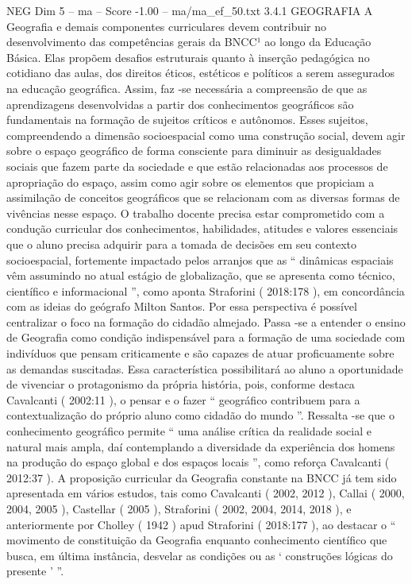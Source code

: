 \begin{textsample}{NEG Dim 5 – ma – Score -1.00 – ma/ma\_ef\_50.txt}  \label{ex:f5_neg_117}
3.4.1 GEOGRAFIA A Geografia e demais componentes curriculares devem contribuir no desenvolvimento das competências gerais da BNCC¹ ao longo da Educação Básica.
Elas propõem desafios estruturais quanto à inserção pedagógica no cotidiano das aulas, dos direitos éticos, estéticos e políticos a serem assegurados na educação geográfica.
Assim, faz -se necessária a compreensão de que as aprendizagens desenvolvidas a partir dos conhecimentos geográficos são fundamentais na formação de sujeitos críticos e autônomos.
Esses sujeitos, compreendendo a dimensão socioespacial como uma construção social, devem agir sobre o espaço geográfico de forma consciente para diminuir as desigualdades sociais que fazem parte da sociedade e que estão relacionadas aos processos de apropriação do espaço, assim como agir sobre os elementos que propiciam a assimilação de conceitos geográficos que se relacionam com as diversas formas de vivências nesse espaço.
O trabalho docente precisa estar comprometido com a condução curricular dos conhecimentos, habilidades, atitudes e valores essenciais que o aluno precisa adquirir para a tomada de decisões em seu contexto socioespacial, fortemente impactado pelos arranjos que as “ dinâmicas espaciais vêm assumindo no atual estágio de globalização, que se apresenta como técnico, científico e informacional ”, como aponta Straforini ( 2018:178 ), em concordância com as ideias do geógrafo Milton Santos.
Por essa perspectiva é possível centralizar o foco na formação do cidadão almejado.
Passa -se a entender o ensino de Geografia como condição indispensável para a formação de uma sociedade com indivíduos que pensam criticamente e são capazes de atuar proficuamente sobre as demandas suscitadas.
Essa característica possibilitará ao aluno a oportunidade de vivenciar o protagonismo da própria história, pois, conforme destaca Cavalcanti ( 2002:11 ), o pensar e o fazer “ geográfico contribuem para a contextualização do próprio aluno como cidadão do mundo ”.
Ressalta -se que o conhecimento geográfico permite “ uma análise crítica da realidade social e natural mais ampla, daí contemplando a diversidade da experiência dos homens na produção do espaço global e dos espaços locais ”, como reforça Cavalcanti ( 2012:37 ).
A proposição curricular da Geografia constante na BNCC já tem sido apresentada em vários estudos, tais como Cavalcanti ( 2002, 2012 ), Callai ( 2000, 2004, 2005 ), Castellar ( 2005 ), Straforini ( 2002, 2004, 2014, 2018 ), e anteriormente por Cholley ( 1942 ) apud Straforini ( 2018:177 ), ao destacar o “ movimento de constituição da Geografia enquanto conhecimento científico que busca, em última instância, desvelar as condições ou as ‘ construções lógicas do presente ’ ”.

\end{textsample}
